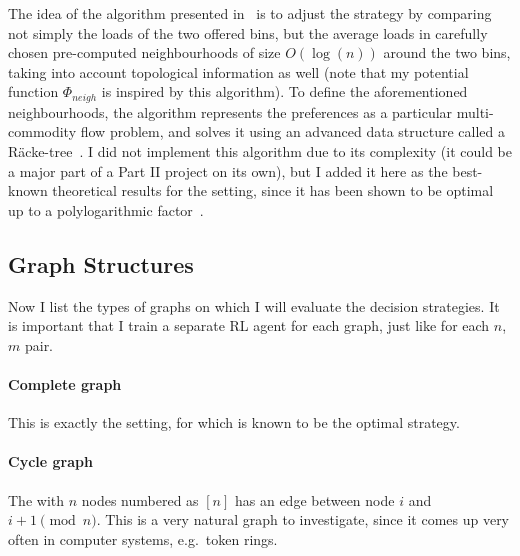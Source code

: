 The idea of the algorithm presented in~\cite{bansal2021twochoicegraphical} is to adjust the \Greedy strategy by comparing not simply the loads of the two offered bins, but the average loads in carefully chosen pre-computed neighbourhoods of size $O(\log(n))$ around the two bins, taking into account topological information as well (note that my potential function $\Phi_{neigh}$ is inspired by this algorithm). To define the aforementioned neighbourhoods, the algorithm represents the preferences as a particular multi-commodity flow problem, and solves it using an advanced data structure called a R\"{a}cke-tree~\cite{racke2008racketree}. I did not implement this algorithm due to its complexity (it could be a major part of a Part II project on its own), but I added it here as the best-known theoretical results for the \GraphicalTwoChoice setting, since it has been shown to be optimal up to a polylogarithmic factor~\cite{bansal2021twochoicegraphical}.



\subsection{Graph Structures}


Now I list the types of graphs on which I will evaluate the decision strategies. It is important that I train a separate RL agent for each graph, just like for each $n$, $m$ pair.


\paragraph{Complete graph} This is exactly the \TwoChoice setting, for which \Greedy is known to be the optimal strategy. 


\paragraph{Cycle graph} The \CycleGraph with $n$ nodes numbered as $[n]$ has an edge between node $i$ and $i+1 \pmod{n}$. This is a very natural graph to investigate, since it comes up very often in computer systems, e.g.\ token rings.


